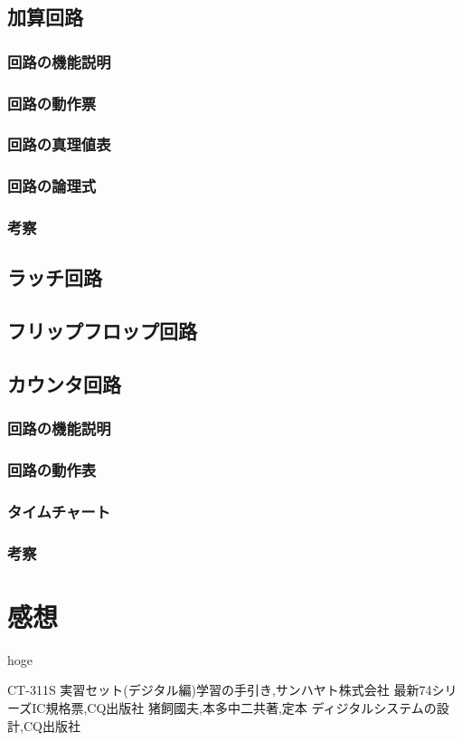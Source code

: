\documentclass[twocolumn, 10pt,a4j]{jsarticle}
\begin{document}
\subsection{加算回路}
\subsubsection{回路の機能説明}
\subsubsection{回路の動作票}
\subsubsection{回路の真理値表}
\subsubsection{回路の論理式}
\subsubsection{考察}
\subsection{ラッチ回路}
\subsection{フリップフロップ回路}
\subsection{カウンタ回路}
\subsubsection{回路の機能説明}
\subsubsection{回路の動作表}
\subsubsection{タイムチャート}
\subsubsection{考察}

\section{感想}
hoge


\begin{thebibliography}{3}
\bibitem{}CT-311S 実習セット(デジタル編)学習の手引き,サンハヤト株式会社
\bibitem{}最新74シリーズIC規格票,CQ出版社
\bibitem{}猪飼國夫,本多中二共著,定本 ディジタルシステムの設計,CQ出版社
\end{thebibliography}
\end{document}
